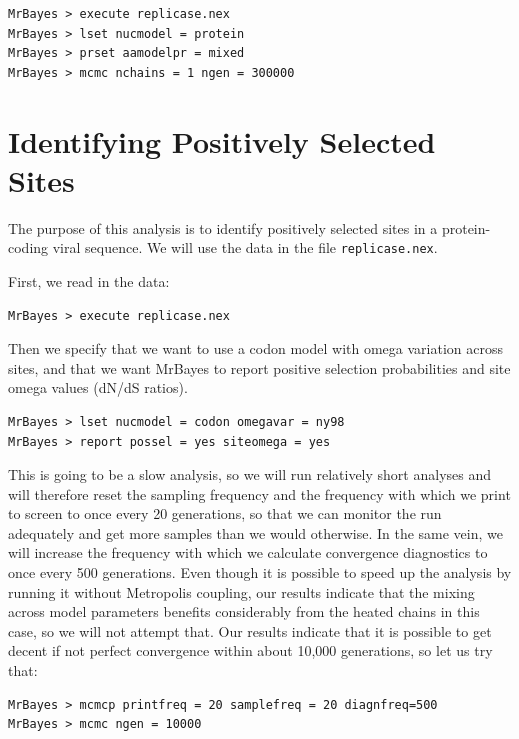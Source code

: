 \documentclass[12pt]{book}
\begin{document}
\begin{singlespacing}
\begin{verbatim}
MrBayes > execute replicase.nex
MrBayes > lset nucmodel = protein
MrBayes > prset aamodelpr = mixed
MrBayes > mcmc nchains = 1 ngen = 300000
\end{verbatim}
\end{singlespacing}

\section{Identifying Positively Selected Sites}
The purpose of this analysis is to identify positively selected sites in a protein-coding viral sequence.
We will use the data in the file \texttt{replicase.nex}.

First, we read in the data:

\begin{verbatim}
MrBayes > execute replicase.nex
\end{verbatim}

Then we specify that we want to use a codon model with omega variation across sites, and that we want
MrBayes to report positive selection probabilities and site omega values (dN/dS ratios).

\begin{singlespacing}
\begin{verbatim}
MrBayes > lset nucmodel = codon omegavar = ny98
MrBayes > report possel = yes siteomega = yes
\end{verbatim}
\end{singlespacing}

This is going to be a slow analysis, so we will run relatively short analyses and will therefore reset the sampling
frequency and the frequency with which we print to screen to once every 20 generations, so that we can monitor
the run adequately and get more samples than we would otherwise. In the same vein, we will increase the frequency
with which we calculate convergence diagnostics to once every 500 generations. Even though it is possible to speed
up the analysis by running it without Metropolis coupling, our results indicate that the mixing across model parameters
benefits considerably from the heated chains in this case, so we will not attempt that. Our results indicate that it
is possible to get decent if not perfect convergence within about 10,000 generations, so let us try that:

\begin{singlespacing}
\begin{verbatim}
MrBayes > mcmcp printfreq = 20 samplefreq = 20 diagnfreq=500
MrBayes > mcmc ngen = 10000
\end{verbatim}
\end{singlespacing}
\end{document}
